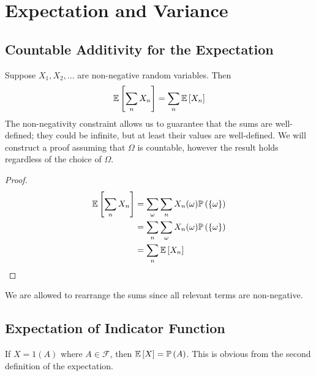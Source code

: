 \documentclass{article}
\begin{document}
\section{Expectation and Variance}
\subsection{Countable Additivity for the Expectation}
Suppose $X_1, X_2, \dots$ are non-negative random variables. Then
\[ \mathbb{E}\left[{\sum_n X_n}\right] = \sum_n \mathbb{E}\left[{X_n}\right] \]
The non-negativity constraint allows us to guarantee that the sums are well-defined; they could be infinite, but at least their values are well-defined. We will construct a proof assuming that $\Omega$ is countable, however the result holds regardless of the choice of $\Omega$.
\begin{proof}
	\begin{align*}
		\mathbb{E}\left[{\sum_n X_n}\right] & = \sum_\omega \sum_n X_n(\omega) \mathbb{P}\left({\{ \omega \}}\right) \\
		                    & = \sum_n \sum_\omega X_n(\omega) \mathbb{P}\left({\{ \omega \}}\right) \\
		                    & = \sum_n \mathbb{E}\left[{X_n}\right]
	\end{align*}
\end{proof}
\noindent We are allowed to rearrange the sums since all relevant terms are non-negative.

\subsection{Expectation of Indicator Function}
If $X = 1(A)$ where $A \in \mathcal F$, then $\mathbb{E}\left[{X}\right] = \mathbb{P}\left({A}\right)$. This is obvious from the second definition of the expectation.
\end{document}
